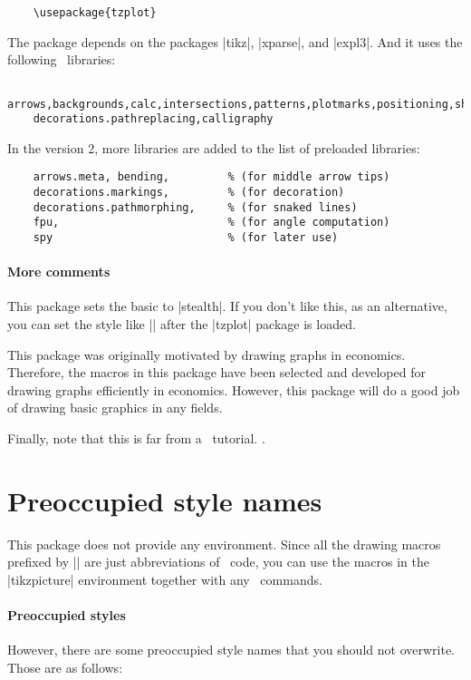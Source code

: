\begin{verbatim}
    \usepackage{tzplot}
\end{verbatim}

The package depends on the packages |tikz|, |xparse|, and |expl3|.
And it uses the following \Tikz\ libraries:
\begin{verbatim}
    arrows,backgrounds,calc,intersections,patterns,plotmarks,positioning,shapes,
    decorations.pathreplacing,calligraphy
\end{verbatim}

In the version 2, more libraries are added to the list of preloaded libraries:
\begin{verbatim}
    arrows.meta, bending,         % (for middle arrow tips)
    decorations.markings,         % (for decoration)
    decorations.pathmorphing,     % (for snaked lines)
    fpu,                          % (for angle computation)
    spy                           % (for later use)
\end{verbatim}

\paragraph{More comments}
This package sets the basic  to |stealth|.
If you don't like this, as an alternative, you can set the style like |\tikzset{>=to}| after the |tzplot| package is loaded.

This package was originally motivated by drawing graphs in economics.
Therefore, the macros in this package have been selected and developed for drawing graphs efficiently in economics. However, this package will do a good job of drawing basic graphics in any fields.

Finally, note that this is far from a \Tikz\ tutorial.
.

\section{Preoccupied style names}
\label{s:stylenames}

This package does not provide any environment.
Since all the drawing macros prefixed by |\tz| are just abbreviations of \Tikz\ code,
you can use the macros in the |tikzpicture| environment together with any \Tikz\ commands.

\paragraph{Preoccupied styles}
However, there are some preoccupied style names that you should not overwrite.
Those are as follows:

